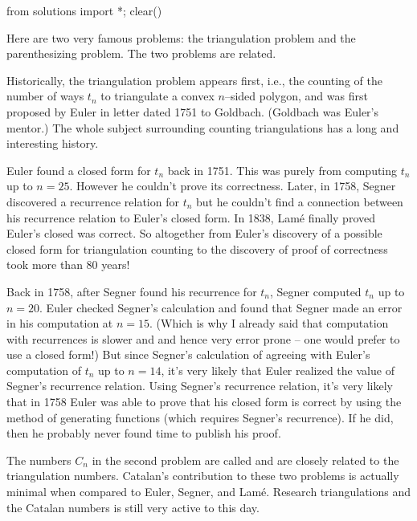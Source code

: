 
\begin{python0}
from solutions import *; clear() 
\end{python0}


Here are two very famous problems: the triangulation problem
and the parenthesizing problem.
The two problems are related.

Historically, the triangulation problem appears first, i.e.,
the counting of the number of ways $t_n$ to triangulate a convex $n$--sided
polygon,
and was first proposed by Euler in letter dated 1751 to Goldbach.
(Goldbach was Euler’s mentor.)
The whole subject surrounding counting triangulations has a
long and interesting history.

Euler found a closed form for $t_n$ back in 1751.
This was purely from computing $t_n$ up to $n = 25$.
However he couldn't prove its correctness.
Later, in 1758, Segner discovered a recurrence relation
for $t_n$ but he couldn't find a connection between his recurrence
relation to Euler's closed form.
In 1838, Lam\'e finally proved Euler's closed was correct.
So altogether from Euler's discovery of a possible closed form
for triangulation counting to the discovery of proof of correctness took more
than 80 years!

Back in 1758, after Segner found his recurrence for $t_n$,
Segner computed $t_n$ up to $n = 20$.
Euler checked Segner's calculation and found that Segner
made an error in his computation at $n = 15$.
(Which is why I already said that computation with
recurrences is slower and and hence
very error prone -- one would prefer to use a closed form!)
But since Segner's calculation of agreeing with Euler's computation
of $t_n$ up to $n = 14$, it's very likely that
Euler realized the value of Segner's recurrence relation.
Using Segner's recurrence relation, it's very likely that
in 1758 Euler was able to prove that his closed form is
correct by using the method of generating functions (which
requires Segner's recurrence).
If he did, then he probably never found time to publish
his proof.

The numbers $C_n$ in the second problem are called
 and are closely related to the
triangulation numbers.
Catalan's contribution to these two problems is actually
minimal when compared to Euler, Segner, and Lam\'e.
Research triangulations and the Catalan numbers is still very active
to this day.

